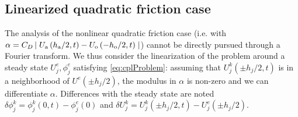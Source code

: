 \subsection{Linearized quadratic friction case}
The analysis of the nonlinear quadratic friction case (i.e. with $\alpha = C_D\left|\right.U_{\rm a}\left(h_{\rm a} / 2, t\right) - U_{\rm o}\left(- h_{\rm o}/2, t\right)\left.\right|$)
cannot be directly pursued through a Fourier transform.
We thus consider the linearization of the problem 
around a steady state $U^e_j, \phi^e_j$ satisfying \eqref{eq:cplProblem}:
assuming that $U^k_j (\pm h_j/2, t)$ is in a neighborhood of $U^e(\pm h_j/2)$, the modulus in $\alpha$
is non-zero and
we can differentiate $\alpha$.
Differences with the steady state are noted $\delta \phi_j^k = \phi^k_j(0,t) - \phi_j^e(0)$ and $\delta U_j^k = U_j^k(\pm h_j/2, t) - U^e_j(\pm h_j/2)$.
